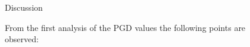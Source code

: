 \documentclass[final,a0,portrait]{beamer}
\newlength{\sepwid}
\newlength{\onecolwid}
\newlength{\twocolwid}
\begin{document}
\begin{frame}[t]
\begin{columns}[t]
\begin{column}{\twocolwid}
\vskip-3cm
\begin{columns}[t]
\begin{column}{\onecolwid}
\end{column}


\begin{column}{\sepwid}\end{column} %

\begin{column}{\onecolwid}
\begin{block}{Discussion}
{\small

From the first analysis of the PGD values the following points are observed:

}
\end{block}
\end{column}
\end{columns}
\end{column}
\end{columns}
\end{frame}
\end{document}
